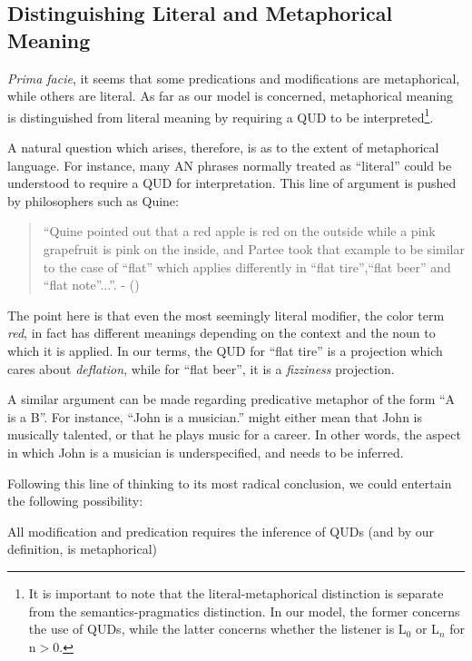 \documentclass[10pt,letterpaper,twocolumn]{article}
\begin{document}
\subsection{Distinguishing Literal and Metaphorical Meaning} \label{litvsmet}

\emph{Prima facie}, it seems that some predications and modifications are metaphorical, while others are literal. As far as our model is concerned, metaphorical meaning is distinguished from literal meaning by requiring a QUD to be interpreted\footnote{It is important to note that the literal-metaphorical distinction is separate from the semantics-pragmatics distinction. In our model, the former concerns the use of QUDs, while the latter concerns whether the listener is L$_0$ or L$_n$ for n$>$0.}.

A natural question which arises, therefore, is as to the extent of metaphorical language. For instance, many AN phrases normally treated as ``literal'' could be understood to require a QUD for interpretation. This line of argument is pushed by philosophers such as Quine:
	\begin{quote}
		``Quine pointed out that a red apple is red on the outside while a pink grapefruit is pink on the inside, and Partee took that example to be similar to the case of ``flat'' which applies differently in ``flat tire'',``flat beer'' and ``flat note''...''. - (\cite{lahav}) 
	\end{quote}

The point here is that even the most seemingly literal modifier, the color term \emph{red}, in fact has different meanings depending on the context and the noun to which it is applied. In our terms, the QUD for ``flat tire'' is a projection which cares about \emph{deflation}, while for ``flat beer'', it is a \emph{fizziness} projection.


A similar argument can be made regarding predicative metaphor of the form ``A is a B''. For instance, ``John is a musician.'' might either mean that John is musically talented, or that he plays music for a career. In other words, the aspect in which John is a musician is underspecified, and needs to be inferred.

Following this line of thinking to its most radical conclusion, we could entertain the following possibility:
\begin{exe}
\ex All modification and predication requires the inference of QUDs (and by our definition, is metaphorical) \label{prop3}
\end{exe}
\end{document}
